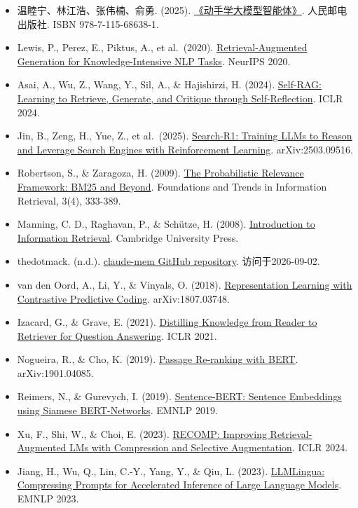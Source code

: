 \vspace{0.25em}
\begin{itemize}
\tightlist
\item
  温睦宁、林江浩、张伟楠、俞勇. (2025). \href{https://haa.boyuai.com/}{《动手学大模型智能体》}. 人民邮电出版社. ISBN 978-7-115-68638-1.
\item
  Lewis, P., Perez, E., Piktus, A., et al.~(2020). \href{https://proceedings.neurips.cc/paper/2020/hash/6b493230-Abstract.html}{Retrieval-Augmented Generation for Knowledge-Intensive NLP Tasks}. NeurIPS 2020.
\item
  Asai, A., Wu, Z., Wang, Y., Sil, A., \& Hajishirzi, H. (2024). \href{https://openreview.net/forum?id=hSyW5go0v8}{Self-RAG: Learning to Retrieve, Generate, and Critique through Self-Reflection}. ICLR 2024.
\item
  Jin, B., Zeng, H., Yue, Z., et al.~(2025). \href{https://arxiv.org/abs/2503.09516}{Search-R1: Training LLMs to Reason and Leverage Search Engines with Reinforcement Learning}. arXiv:2503.09516.
\item
  Robertson, S., \& Zaragoza, H. (2009). \href{https://doi.org/10.1561/1500000019}{The Probabilistic Relevance Framework: BM25 and Beyond}. Foundations and Trends in Information Retrieval, 3(4), 333-389.
\item
  Manning, C. D., Raghavan, P., \& Schütze, H. (2008). \href{https://nlp.stanford.edu/IR-book/}{Introduction to Information Retrieval}. Cambridge University Press.
\item
  thedotmack. (n.d.). \href{https://github.com/thedotmack/claude-mem}{claude-mem GitHub repository}. 访问于2026-09-02.
\item
  van den Oord, A., Li, Y., \& Vinyals, O. (2018). \href{https://arxiv.org/abs/1807.03748}{Representation Learning with Contrastive Predictive Coding}. arXiv:1807.03748.
\item
  Izacard, G., \& Grave, E. (2021). \href{https://arxiv.org/abs/2012.04584}{Distilling Knowledge from Reader to Retriever for Question Answering}. ICLR 2021.
\item
  Nogueira, R., \& Cho, K. (2019). \href{https://arxiv.org/abs/1901.04085}{Passage Re-ranking with BERT}. arXiv:1901.04085.
\item
  Reimers, N., \& Gurevych, I. (2019). \href{https://arxiv.org/abs/1908.10084}{Sentence-BERT: Sentence Embeddings using Siamese BERT-Networks}. EMNLP 2019.
\item
  Xu, F., Shi, W., \& Choi, E. (2023). \href{https://arxiv.org/abs/2310.04408}{RECOMP: Improving Retrieval-Augmented LMs with Compression and Selective Augmentation}. ICLR 2024.
\item
  Jiang, H., Wu, Q., Lin, C.-Y., Yang, Y., \& Qiu, L. (2023). \href{https://arxiv.org/abs/2310.05736}{LLMLingua: Compressing Prompts for Accelerated Inference of Large Language Models}. EMNLP 2023.
\end{itemize}


